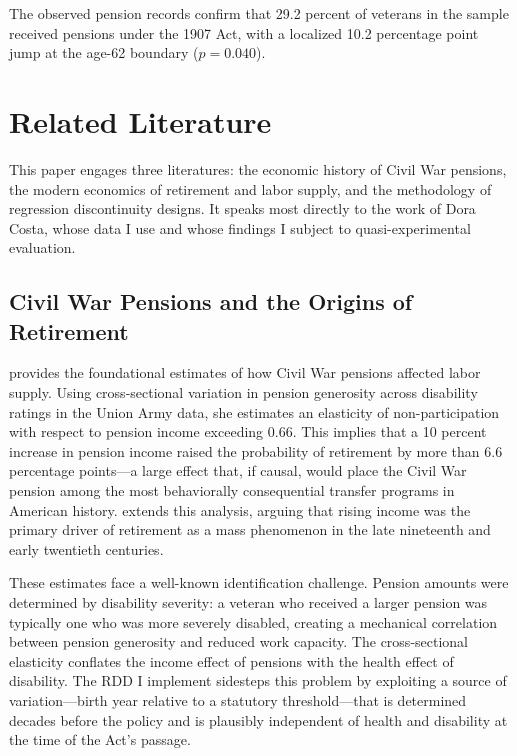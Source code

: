 \documentclass[12pt]{article}
\begin{document}
The observed pension records confirm that 29.2 percent of veterans in the sample received pensions under the 1907 Act, with a localized 10.2 percentage point jump at the age-62 boundary ($p = 0.040$).


\section{Related Literature}

This paper engages three literatures: the economic history of Civil War pensions, the modern economics of retirement and labor supply, and the methodology of regression discontinuity designs. It speaks most directly to the work of Dora Costa, whose data I use and whose findings I subject to quasi-experimental evaluation.

\subsection{Civil War Pensions and the Origins of Retirement}

\citet{costa1995pensions} provides the foundational estimates of how Civil War pensions affected labor supply. Using cross-sectional variation in pension generosity across disability ratings in the Union Army data, she estimates an elasticity of non-participation with respect to pension income exceeding 0.66. This implies that a 10 percent increase in pension income raised the probability of retirement by more than 6.6 percentage points---a large effect that, if causal, would place the Civil War pension among the most behaviorally consequential transfer programs in American history. \citet{costa1998pensions} extends this analysis, arguing that rising income was the primary driver of retirement as a mass phenomenon in the late nineteenth and early twentieth centuries.

These estimates face a well-known identification challenge. Pension amounts were determined by disability severity: a veteran who received a larger pension was typically one who was more severely disabled, creating a mechanical correlation between pension generosity and reduced work capacity. The cross-sectional elasticity conflates the income effect of pensions with the health effect of disability. The RDD I implement sidesteps this problem by exploiting a source of variation---birth year relative to a statutory threshold---that is determined decades before the policy and is plausibly independent of health and disability at the time of the Act's passage.
\end{document}
